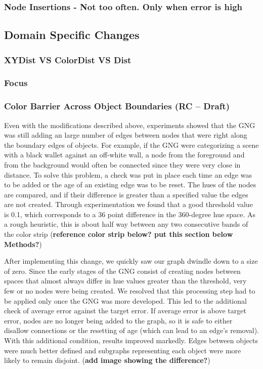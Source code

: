 \documentclass{article}
\renewcommand{\|}{\origbar} %
\begin{document}
\subsubsection{Node Insertions - Not too often. Only when error is high}

\subsection{Domain Specific Changes}

\subsubsection{XYDist VS ColorDist VS Dist}
\subsubsection{Focus}

\subsubsection{Color Barrier Across Object Boundaries (RC -- Draft)}

Even with the modifications described above, experiments showed that the GNG was still adding an large number of edges between nodes that were right along the boundary edges of objects. For example, if the GNG were categorizing a scene with a black wallet against an off-white wall, a node from the foreground and from the background would often be connected since they were very close in distance. To solve this problem, a check was put in place each time an edge was to be added or the age of an existing edge was to be reset. The hues of the nodes are compared, and if their difference is greater than a specified value the edges are not created. Through experimentation we found that a good threshold value is 0.1, which corresponds to a 36 point difference in the 360-degree hue space. As a rough heuristic, this is about half way between any two consecutive bands of the color strip ({\bf reference color strip below? put this section below Methods?})

After implementing this change, we quickly saw our graph dwindle down to a size of zero. Since the early stages of the GNG consist of creating nodes between spaces that almost always differ in hue values greater than the threshold, very few or no nodes were being created. We resolved that this processing step had to be applied only once the GNG was more developed. This led to the additional check of average error against the target error. If average error is above target error, nodes are no longer being added to the graph, so it is safe to either disallow connections or the resetting of age (which can lead to an edge's removal). With this additional condition, results improved markedly. Edges between objects were much better defined and subgraphs representing each object were more likely to remain disjoint. ({\bf add image showing the difference?})
\end{document}
